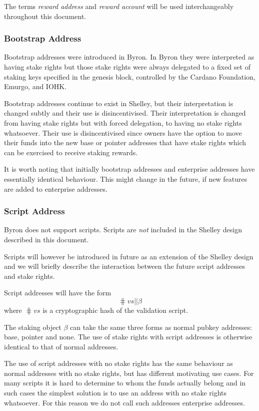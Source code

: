 \documentclass[11pt,a4paper,dvipsnames,twosided]{article}
\begin{document}
The terms \emph{reward address} and \emph{reward account} will be used
interchangeably throughout this document.

\subsubsection{Bootstrap Address}
\label{bootstrap-address}

Bootstrap addresses were introduced in Byron. In Byron they were
interpreted as having stake rights but those stake rights were always
delegated to a fixed set of staking keys specified in the genesis block,
controlled by the Cardano Foundation, Emurgo, and IOHK.

Bootstrap addresses continue to exist in Shelley, but their
interpretation is changed subtly and their use is disincentivised.
Their interpretation is changed from having stake rights but with
forced delegation, to having no stake rights whatsoever. Their use is
disincentivised since owners have the option to move their funds into
the new base or pointer addresses that have stake rights which can be
exercised to receive staking rewards.

It is worth noting that initially bootstrap addresses and enterprise addresses
have essentially identical behaviour. This might change in the future, if new
features are added to enterprise addresses.

\subsubsection{Script Address}
\label{script-address}

Byron does not support scripts. Scripts are \emph{not} included in the
Shelley design described in this document.

Scripts will however be introduced in future as an extension of the
Shelley design and we will briefly describe the interaction between the
future script addresses and stake rights.

Script addresses will have the form
\[
\hash{vs} \mathbin{||} \beta
\]
where \(\hash{vs}\) is a cryptographic hash of the validation script.

The staking object \(\beta\) can take the same three forms as normal
pubkey addresses: base, pointer and none. The use of stake rights with
script addresses is otherwise identical to that of normal addresses.

The use of script addresses with no stake rights has the same behaviour
as normal addresses with no stake rights, but has different motivating
use cases. For many scripts it is hard to determine to whom the funds
actually belong and in such cases the simplest solution is to use an
address with no stake rights whatsoever. For this reason we do not call
such addresses enterprise addresses.
\end{document}
